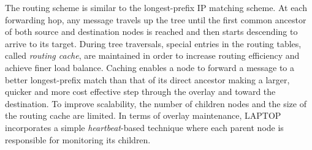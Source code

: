 %

The routing scheme is similar to the longest-prefix IP matching scheme. At each
forwarding hop, any message travels up the tree until the first common ancestor
of both source and destination nodes is reached and then starts descending to
arrive to its target. During tree traversals, special entries in the routing
tables, called \emph{routing cache}, are maintained in order to increase routing
efficiency and achieve finer load balance. Caching enables a node to forward a
message to a better longest-prefix match than that of its direct ancestor making
a larger, quicker and more cost effective step through the overlay and toward
the destination. To improve scalability, the number of children nodes and the
size of the routing cache are limited. In terms of overlay maintenance, LAPTOP
incorporates a simple \emph{heartbeat}-based technique where each parent node is
responsible for monitoring its children.

%
%

